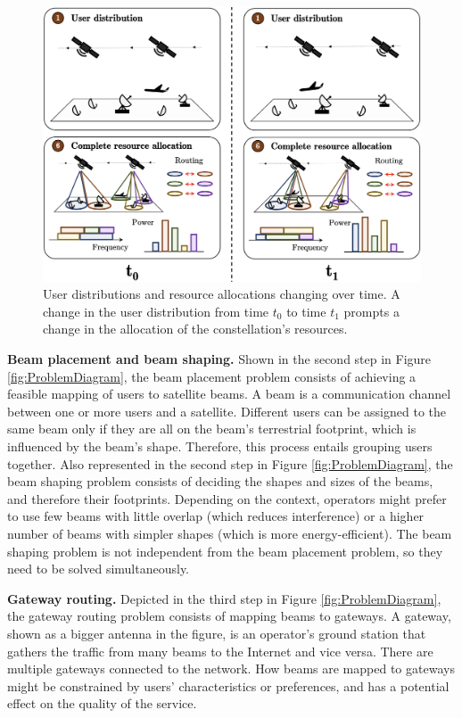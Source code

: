 \documentclass[letterpaper]{article} %
\begin{document}
\begin{figure}[t]
\begin{center}
\includegraphics[width=0.99\linewidth]{pics/diagram_update.png}
\end{center}
\caption{User distributions and resource allocations changing over time. A change in the user distribution from time $t_0$ to time $t_1$ prompts a change in the allocation of the constellation's resources.}
\label{fig:DiagramUpdate}
\end{figure}

\textbf{Beam placement and beam shaping.}
Shown in the second step in Figure \ref{fig:ProblemDiagram}, the beam placement problem consists of achieving a feasible mapping of users to satellite beams. A beam is a communication channel between one or more users and a satellite. Different users can be assigned to the same beam only if they are all on the beam's terrestrial footprint, which is influenced by the beam's shape. Therefore, this process entails grouping users together. Also represented in the second step in Figure \ref{fig:ProblemDiagram}, the beam shaping problem consists of deciding the shapes and sizes of the beams, and therefore their footprints. Depending on the context, operators might prefer to use few beams with little overlap (which reduces interference) or a higher number of beams with simpler shapes (which is more energy-efficient). The beam shaping problem is not independent from the beam placement problem, so they need to be solved simultaneously.

\textbf{Gateway routing.}
Depicted in the third step in Figure \ref{fig:ProblemDiagram}, the gateway routing problem consists of mapping beams to gateways. A gateway, shown as a bigger antenna in the figure, is an operator's ground station that gathers the traffic from many beams to the Internet and vice versa. There are multiple gateways connected to the network. How beams are mapped to gateways might be constrained by users' characteristics or preferences, and has a potential effect on the quality of the service.
\end{document}
